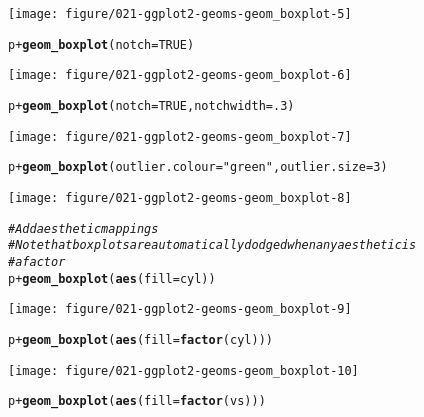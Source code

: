 \documentclass[a4paper,titlepage]{tufte-handout}\usepackage[]{graphicx}\usepackage[]{color}
\makeatletter
\def\maxwidth{ %
  \ifdim\Gin@nat@width>\linewidth
    \linewidth
  \else
    \Gin@nat@width
  \fi
}
\newcommand{\hlnum}[1]{\textcolor[rgb]{0.686,0.059,0.569}{#1}}%
\newcommand{\hlstr}[1]{\textcolor[rgb]{0.192,0.494,0.8}{#1}}%
\newcommand{\hlcom}[1]{\textcolor[rgb]{0.678,0.584,0.686}{\textit{#1}}}%
\newcommand{\hlopt}[1]{\textcolor[rgb]{0,0,0}{#1}}%
\newcommand{\hlstd}[1]{\textcolor[rgb]{0.345,0.345,0.345}{#1}}%
\newcommand{\hlkwc}[1]{\textcolor[rgb]{0.333,0.667,0.333}{#1}}%
\newcommand{\hlkwd}[1]{\textcolor[rgb]{0.737,0.353,0.396}{\textbf{#1}}}%
\newenvironment{kframe}{%
 \def\at@end@of@kframe{}%
 \ifinner\ifhmode%
  \def\at@end@of@kframe{\end{minipage}}%
  \begin{minipage}{\columnwidth}%
 \fi\fi%
 \def\FrameCommand##1{\hskip\@totalleftmargin \hskip-\fboxsep
 \colorbox{shadecolor}{##1}\hskip-\fboxsep
     \hskip-\linewidth \hskip-\@totalleftmargin \hskip\columnwidth}%
 \MakeFramed {\advance\hsize-\width
   \@totalleftmargin\z@ \linewidth\hsize
   \@setminipage}}%
 {\par\unskip\endMakeFramed%
 \at@end@of@kframe}
\newenvironment{knitrout}{}{} %
\makeatother
\begin{document}
\begin{knitrout}
\texttt{[image: figure/021-ggplot2-geoms-geom\_boxplot-5]} 
\begin{kframe}\begin{alltt}
\hlstd{p} \hlopt{+} \hlkwd{geom_boxplot}\hlstd{(}\hlkwc{notch} \hlstd{=} \hlnum{TRUE}\hlstd{)}
\end{alltt}
\end{kframe}
\texttt{[image: figure/021-ggplot2-geoms-geom\_boxplot-6]} 
\begin{kframe}\begin{alltt}
\hlstd{p} \hlopt{+} \hlkwd{geom_boxplot}\hlstd{(}\hlkwc{notch} \hlstd{=} \hlnum{TRUE}\hlstd{,} \hlkwc{notchwidth} \hlstd{=} \hlnum{.3}\hlstd{)}
\end{alltt}
\end{kframe}
\texttt{[image: figure/021-ggplot2-geoms-geom\_boxplot-7]} 
\begin{kframe}\begin{alltt}
\hlstd{p} \hlopt{+} \hlkwd{geom_boxplot}\hlstd{(}\hlkwc{outlier.colour} \hlstd{=} \hlstr{"green"}\hlstd{,} \hlkwc{outlier.size} \hlstd{=} \hlnum{3}\hlstd{)}
\end{alltt}
\end{kframe}
\texttt{[image: figure/021-ggplot2-geoms-geom\_boxplot-8]} 
\begin{kframe}\begin{alltt}
\hlcom{# Add aesthetic mappings}
\hlcom{# Note that boxplots are automatically dodged when any aesthetic is}
\hlcom{# a factor}
\hlstd{p} \hlopt{+} \hlkwd{geom_boxplot}\hlstd{(}\hlkwd{aes}\hlstd{(}\hlkwc{fill} \hlstd{= cyl))}
\end{alltt}
\end{kframe}
\texttt{[image: figure/021-ggplot2-geoms-geom\_boxplot-9]} 
\begin{kframe}\begin{alltt}
\hlstd{p} \hlopt{+} \hlkwd{geom_boxplot}\hlstd{(}\hlkwd{aes}\hlstd{(}\hlkwc{fill} \hlstd{=} \hlkwd{factor}\hlstd{(cyl)))}
\end{alltt}
\end{kframe}
\texttt{[image: figure/021-ggplot2-geoms-geom\_boxplot-10]} 
\begin{kframe}\begin{alltt}
\hlstd{p} \hlopt{+} \hlkwd{geom_boxplot}\hlstd{(}\hlkwd{aes}\hlstd{(}\hlkwc{fill} \hlstd{=} \hlkwd{factor}\hlstd{(vs)))}
\end{alltt}
\end{kframe}

\end{knitrout}
\end{document}
